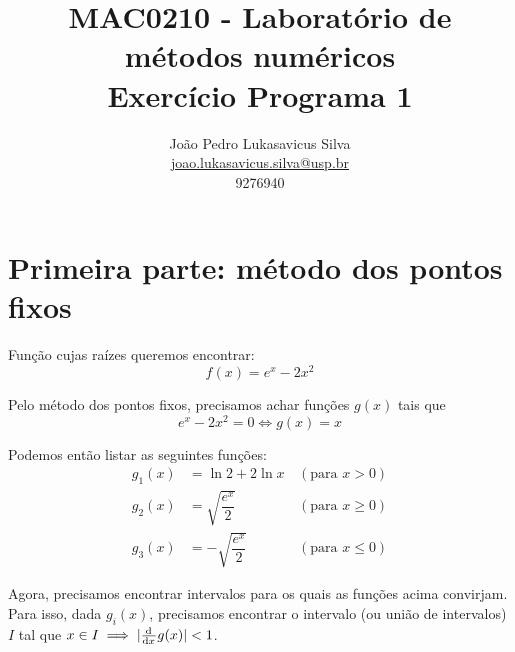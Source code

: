 \documentclass{article}
\title{
   MAC0210 - Laboratório de métodos numéricos\\
   Exercício Programa 1
}
\author{
    João Pedro Lukasavicus Silva\\
    \href{mailto:joao.lukasavicus.silva@usp.br}
    {joao.lukasavicus.silva@usp.br}\\
    9276940
}
\begin{document}
\maketitle
\section{Primeira parte: método dos pontos fixos}
Função cujas raízes queremos encontrar:
  \begin{equation}
      f(x) = e^x - 2x^2
  \end{equation}
  
Pelo método dos pontos fixos, precisamos achar funções $g(x)$ tais que
$$
  e^x - 2x^2 = 0 \iff g(x) = x
$$
  
  Podemos então listar as seguintes funções:
  \begin{align*}
    g_1(x) &= \ln 2 + 2 \ln x \, &(\text{para } x > 0)
    \\
    g_2(x) &= \sqrt{\dfrac{e^x}{2}} \, &(\text{para } x \geq 0)
    \\
    g_3(x) &= -\sqrt{\dfrac{e^x}{2}} \, &(\text{para } x \leq 0)
  \end{align*}
  
  Agora, precisamos encontrar intervalos para os quais as funções acima convirjam. Para isso, dada $g_i(x)$, precisamos encontrar o intervalo (ou união de intervalos) $I$ tal que $x \in I \implies |\od{}{x} g(x)| < 1$.
  
\end{document}
